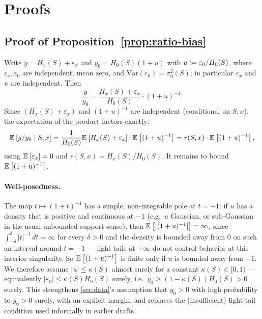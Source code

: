 %   

\section{Proofs}
\label{app:proofs}

\subsection{Proof of Proposition~\ref{prop:ratio-bias}}
\label{app:proof-ratio-bias}
\begin{pf}
Write $y = H_x(S) + \varepsilon_x$ and $y_0 = H_0(S)(1+u)$ with $u\vcentcolon=\varepsilon_0/H_0(S)$, where $\varepsilon_x,\varepsilon_0$ are independent, mean zero, and $\mathrm{Var}(\varepsilon_0)=\sigma_0^2(S)$; in particular $\varepsilon_x$ and $u$ are independent. Then
\[
    \frac{y}{y_0} = \frac{H_x(S)+\varepsilon_x}{H_0(S)}\cdot(1+u)^{-1}.
\]
Since $(H_x(S)+\varepsilon_x)$ and $(1+u)^{-1}$ are independent (conditional on $S,x$), the expectation of the product factors exactly:
\[
    \mathbb{E}_{}\left[{y/y_0\mid S,x}\right] = \frac{1}{H_0(S)}\mathbb{E}_{}\left[{H_x(S)+\varepsilon_x}\right]\cdot\mathbb{E}_{}\left[{(1+u)^{-1}}\right] = r(S,x)\cdot\mathbb{E}_{}\left[{(1+u)^{-1}}\right],
\]
using $\mathbb{E}_{}\left[{\varepsilon_x}\right]=0$ and $r(S,x)=H_x(S)/H_0(S)$. It remains to bound $\mathbb{E}_{}\left[{(1+u)^{-1}}\right]$.

\paragraph{Well-posedness.} The map $t\mapsto(1+t)^{-1}$ has a simple, non-integrable pole at $t=-1$: if $u$ has a density that is positive and continuous at $-1$ (e.g.\ $u$ Gaussian, or sub-Gaussian in the usual unbounded-support sense), then $\mathbb{E}_{}\left[{|(1+u)^{-1}|}\right]=\infty$, since $\int_{-\delta}^{\delta}|t|^{-1}\,dt=\infty$ for every $\delta>0$ and the density is bounded away from $0$ on such an interval around $t=-1$ — light tails at $\pm\infty$ do not control behavior at this interior singularity. So $\mathbb{E}_{}\left[{(1+u)^{-1}}\right]$ is finite only if $u$ is bounded away from $-1$. We therefore assume $|u|\le\kappa(S)$ almost surely for a constant $\kappa(S)\in[0,1)$ — equivalently $|\varepsilon_0|\le\kappa(S)H_0(S)$ surely, i.e.\ $y_0\ge(1-\kappa(S))H_0(S)>0$ surely. This strengthens \cref{sec:data}'s assumption that $y_0>0$ with high probability to $y_0>0$ surely, with an explicit margin, and replaces the (insufficient) light-tail condition used informally in earlier drafts.


\end{pf}
